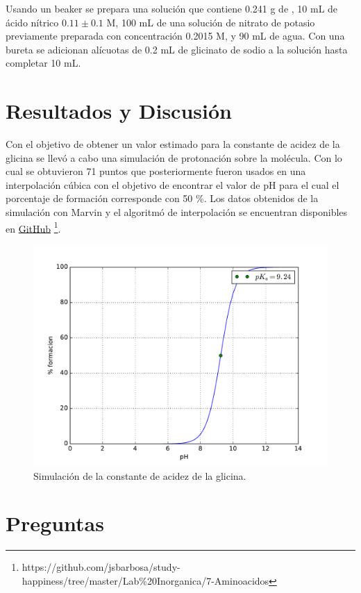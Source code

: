 \documentclass[fleqn,10pt]{SelfArx} %
\begin{document}
	Usando un beaker se prepara una soluci\'on que contiene 0.241 g de , 10 mL de \'acido n\'itrico $0.11\pm0.1$ M, 100 mL de una soluci\'on de nitrato de potasio previamente preparada con concentraci\'on 0.2015 M, y 90 mL de agua. Con una bureta se adicionan al\'icuotas de 0.2 mL de glicinato de sodio a la soluci\'on hasta completar 10 mL.
	
	\section{Resultados y Discusi\'on}
	
	
	Con el objetivo de obtener un valor estimado para la constante de acidez de la glicina se llev\'o a cabo una simulaci\'on de protonaci\'on sobre la mol\'ecula. Con lo cual se obtuvieron 71 puntos que posteriormente fueron usados en una interpolaci\'on c\'ubica con el objetivo de encontrar el valor de pH para el cual el porcentaje de formaci\'on corresponde con 50 \%. Los datos obtenidos de la simulaci\'on con Marvin y el algoritm\'o de interpolaci\'on se encuentran disponibles en \href{https://github.com/jsbarbosa/study-happiness/tree/master/Lab\%20Inorganica/7-Aminoacidos}{\color{blue}GitHub} \footnote{https://github.com/jsbarbosa/study- happiness/tree/master/Lab\%20Inorganica/7-Aminoacidos}.
	\begin{figure}[h]
		\centering
		\includegraphics[width=\linewidth]{images/pka_sim.pdf}
		\caption{Simulaci\'on de la constante de acidez de la glicina.}
	\end{figure}
	
	\section{Preguntas}
\end{document}
